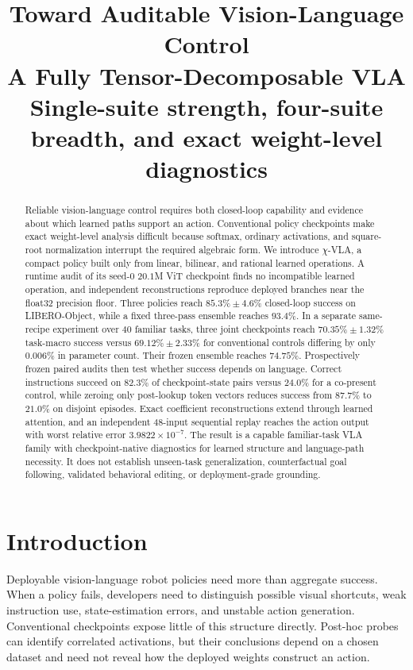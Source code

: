 \documentclass{article}
\title{\textbf{Toward Auditable Vision-Language Control}\\[0.15em]
\textbf{A Fully Tensor-Decomposable VLA}\\[0.35em]
\large Single-suite strength, four-suite breadth, and exact weight-level diagnostics}
\author{}
\date{}
\newcommand{\chivla}{$\chi$-VLA}
\begin{document}
\maketitle

\begin{abstract}
Reliable vision-language control requires both closed-loop capability and evidence about which
learned paths support an action. Conventional policy checkpoints make exact weight-level analysis
difficult because softmax, ordinary activations, and square-root normalization interrupt the
required algebraic form. We introduce \chivla, a compact policy built only from linear, bilinear,
and rational learned operations. A runtime audit of its seed-$0$ $20.1$M ViT checkpoint finds no
incompatible learned operation, and independent reconstructions reproduce deployed branches near
the float32 precision floor. Three policies reach $85.3\%\pm4.6\%$ closed-loop success on
LIBERO-Object, while a fixed three-pass ensemble reaches $93.4\%$. In a separate same-recipe
experiment over $40$ familiar tasks, three joint checkpoints reach $70.35\%\pm1.32\%$ task-macro
success versus $69.12\%\pm2.33\%$ for conventional controls differing by only $0.006\%$ in
parameter count. Their frozen ensemble reaches $74.75\%$. Prospectively frozen paired audits then
test whether success depends on language. Correct instructions succeed on $82.3\%$ of
checkpoint-state pairs versus $24.0\%$ for a co-present control, while zeroing only post-lookup
token vectors reduces success from $87.7\%$ to $21.0\%$ on disjoint episodes. Exact coefficient
reconstructions extend through learned attention, and an independent $48$-input sequential replay
reaches the action output with worst relative error $3.9822\times10^{-7}$. The result is a capable
familiar-task VLA family with checkpoint-native diagnostics for learned structure and language-path
necessity. It does not establish unseen-task generalization, counterfactual goal following,
validated behavioral editing, or deployment-grade grounding.
\end{abstract}

\section{Introduction}

Deployable vision-language robot policies need more than aggregate success. When a policy fails,
developers need to distinguish possible visual shortcuts, weak instruction use, state-estimation
errors, and unstable action generation. Conventional checkpoints expose little of this structure
directly. Post-hoc probes can identify correlated activations, but their conclusions depend on a
chosen dataset and need not reveal how the deployed weights construct an action.
\end{document}
